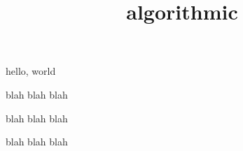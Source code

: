 \documentclass{amsart}
\title{algorithmic}
\begin{document}
\maketitle

hello, world

\begin{tcolorbox}[breakable]
blah blah blah

blah blah blah

blah blah blah
\end{tcolorbox}
\end{document}
